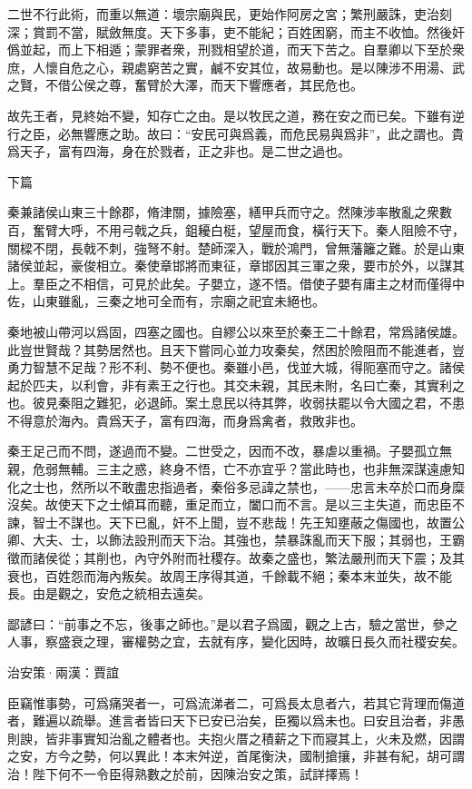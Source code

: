 \documentclass[12pt,a4paper]{ctexbook}
\begin{document}
二世不行此術，而重以無道：壞宗廟與民，更始作阿房之宮；繁刑嚴誅，吏治刻深；賞罰不當，賦斂無度。天下多事，吏不能紀；百姓困窮，而主不收恤。然後奸僞並起，而上下相遁；蒙罪者衆，刑戮相望於道，而天下苦之。自羣卿以下至於衆庶，人懷自危之心，親處窮苦之實，鹹不安其位，故易動也。是以陳涉不用湯、武之賢，不借公侯之尊，奮臂於大澤，而天下響應者，其民危也。\par
故先王者，見終始不變，知存亡之由。是以牧民之道，務在安之而已矣。下雖有逆行之臣，必無響應之助。故曰：“安民可與爲義，而危民易與爲非”，此之謂也。貴爲天子，富有四海，身在於戮者，正之非也。是二世之過也。\par
下篇\par
秦兼諸侯山東三十餘郡，脩津關，據險塞，繕甲兵而守之。然陳涉率散亂之衆數百，奮臂大呼，不用弓戟之兵，鉏耰白梃，望屋而食，橫行天下。秦人阻險不守，關樑不閉，長戟不刺，強弩不射。楚師深入，戰於鴻門，曾無藩籬之難。於是山東諸侯並起，豪俊相立。秦使章邯將而東征，章邯因其三軍之衆，要市於外，以謀其上。羣臣之不相信，可見於此矣。子嬰立，遂不悟。借使子嬰有庸主之材而僅得中佐，山東雖亂，三秦之地可全而有，宗廟之祀宜未絕也。\par
秦地被山帶河以爲固，四塞之國也。自繆公以來至於秦王二十餘君，常爲諸侯雄。此豈世賢哉？其勢居然也。且天下嘗同心並力攻秦矣，然困於險阻而不能進者，豈勇力智慧不足哉？形不利、勢不便也。秦雖小邑，伐並大城，得阨塞而守之。諸侯起於匹夫，以利會，非有素王之行也。其交未親，其民未附，名曰亡秦，其實利之也。彼見秦阻之難犯，必退師。案土息民以待其弊，收弱扶罷以令大國之君，不患不得意於海內。貴爲天子，富有四海，而身爲禽者，救敗非也。\par
秦王足己而不問，遂過而不變。二世受之，因而不改，暴虐以重禍。子嬰孤立無親，危弱無輔。三主之惑，終身不悟，亡不亦宜乎？當此時也，也非無深謀遠慮知化之士也，然所以不敢盡忠指過者，秦俗多忌諱之禁也，——忠言未卒於口而身糜沒矣。故使天下之士傾耳而聽，重足而立，闔口而不言。是以三主失道，而忠臣不諫，智士不謀也。天下已亂，奸不上聞，豈不悲哉！先王知壅蔽之傷國也，故置公卿、大夫、士，以飾法設刑而天下治。其強也，禁暴誅亂而天下服；其弱也，王霸徵而諸侯從；其削也，內守外附而社稷存。故秦之盛也，繁法嚴刑而天下震；及其衰也，百姓怨而海內叛矣。故周王序得其道，千餘載不絕；秦本末並失，故不能長。由是觀之，安危之統相去遠矣。\par
鄙諺曰：“前事之不忘，後事之師也。”是以君子爲國，觀之上古，驗之當世，參之人事，察盛衰之理，審權勢之宜，去就有序，變化因時，故曠日長久而社稷安矣。\par
治安策·兩漢：賈誼 \par
臣竊惟事勢，可爲痛哭者一，可爲流涕者二，可爲長太息者六，若其它背理而傷道者，難遍以疏舉。進言者皆曰天下已安已治矣，臣獨以爲未也。曰安且治者，非愚則諛，皆非事實知治亂之體者也。夫抱火厝之積薪之下而寢其上，火未及燃，因謂之安，方今之勢，何以異此！本末舛逆，首尾衡決，國制搶攘，非甚有紀，胡可謂治！陛下何不一令臣得熟數之於前，因陳治安之策，試詳擇焉！\par
\end{document}
